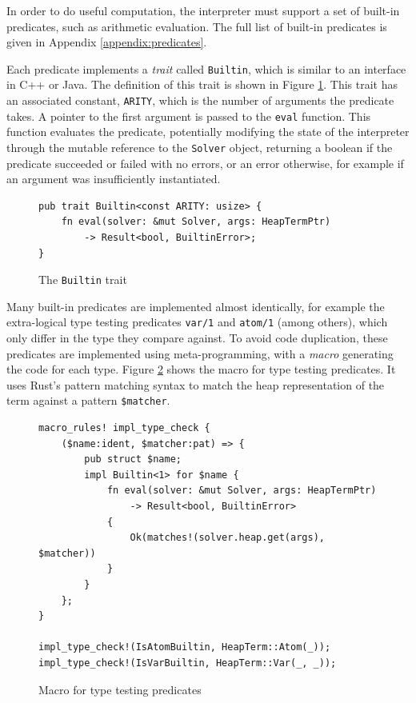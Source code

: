 \label{sec:builtins}

In order to do useful computation, the interpreter must support a set of built-in predicates, such as arithmetic evaluation. The full list of built-in predicates is given in Appendix \ref{appendix:predicates}.

Each predicate implements a \emph{trait} called \texttt{Builtin}, which is similar to an interface in C++ or Java. The definition of this trait is shown in Figure \ref{fig:builtin-trait}. This trait has an associated constant, \texttt{ARITY}, which is the number of arguments the predicate takes. A pointer to the first argument is passed to the \texttt{eval} function. This function evaluates the predicate, potentially modifying the state of the interpreter through the mutable reference to the \texttt{Solver} object, returning a boolean if the predicate succeeded or failed with no errors, or an error otherwise, for example if an argument was insufficiently instantiated.

\begin{figure}[H]
\centering
\begin{verbatim}
pub trait Builtin<const ARITY: usize> {
    fn eval(solver: &mut Solver, args: HeapTermPtr)
        -> Result<bool, BuiltinError>;
}
\end{verbatim}
\caption{The \texttt{Builtin} trait}
\label{fig:builtin-trait}
\end{figure}

Many built-in predicates are implemented almost identically, for example the extra-logical type testing predicates \texttt{var/1} and \texttt{atom/1} (among others), which only differ in the type they compare against. To avoid code duplication, these predicates are implemented using meta-programming, with a \emph{macro} generating the code for each type. Figure \ref{fig:builtin-macro} shows the macro for type testing predicates. It uses Rust's pattern matching syntax to match the heap representation of the term against a pattern \texttt{\$matcher}.

\begin{figure}[H]
\centering
\begin{verbatim}
macro_rules! impl_type_check {
    ($name:ident, $matcher:pat) => {
        pub struct $name;
        impl Builtin<1> for $name {
            fn eval(solver: &mut Solver, args: HeapTermPtr)
                -> Result<bool, BuiltinError>
            {
                Ok(matches!(solver.heap.get(args), $matcher))
            }
        }
    };
}

impl_type_check!(IsAtomBuiltin, HeapTerm::Atom(_));
impl_type_check!(IsVarBuiltin, HeapTerm::Var(_, _));
\end{verbatim}
\caption{Macro for type testing predicates}
\label{fig:builtin-macro}
\end{figure}

